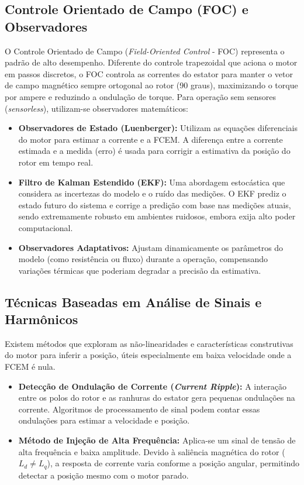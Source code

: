 \documentclass[12pt, a4paper, openright, oneside, brazilian]{abntex2}
\begin{document}
\subsection{Controle Orientado de Campo (FOC) e Observadores}
O Controle Orientado de Campo (\textit{Field-Oriented Control} - FOC) representa o padrão de alto desempenho. Diferente do controle trapezoidal que aciona o motor em passos discretos, o FOC controla as correntes do estator para manter o vetor de campo magnético sempre ortogonal ao rotor (90 graus), maximizando o torque por ampere e reduzindo a ondulação de torque. Para operação sem sensores (\textit{sensorless}), utilizam-se observadores matemáticos:

\begin{itemize}
    \item \textbf{Observadores de Estado (Luenberger):} Utilizam as equações diferenciais do motor para estimar a corrente e a FCEM. A diferença entre a corrente estimada e a medida (erro) é usada para corrigir a estimativa da posição do rotor em tempo real.
    \item \textbf{Filtro de Kalman Estendido (EKF):} Uma abordagem estocástica que considera as incertezas do modelo e o ruído das medições. O EKF prediz o estado futuro do sistema e corrige a predição com base nas medições atuais, sendo extremamente robusto em ambientes ruidosos, embora exija alto poder computacional.
    \item \textbf{Observadores Adaptativos:} Ajustam dinamicamente os parâmetros do modelo (como resistência ou fluxo) durante a operação, compensando variações térmicas que poderiam degradar a precisão da estimativa.
\end{itemize}

\subsection{Técnicas Baseadas em Análise de Sinais e Harmônicos}
Existem métodos que exploram as não-linearidades e características construtivas do motor para inferir a posição, úteis especialmente em baixa velocidade onde a FCEM é nula.
\begin{itemize}
    \item \textbf{Detecção de Ondulação de Corrente (\textit{Current Ripple}):} A interação entre os polos do rotor e as ranhuras do estator gera pequenas ondulações na corrente. Algoritmos de processamento de sinal podem contar essas ondulações para estimar a velocidade e posição.
    \item \textbf{Método de Injeção de Alta Frequência:} Aplica-se um sinal de tensão de alta frequência e baixa amplitude. Devido à saliência magnética do rotor ($L_d \neq L_q$), a resposta de corrente varia conforme a posição angular, permitindo detectar a posição mesmo com o motor parado.
\end{itemize}
\end{document}
